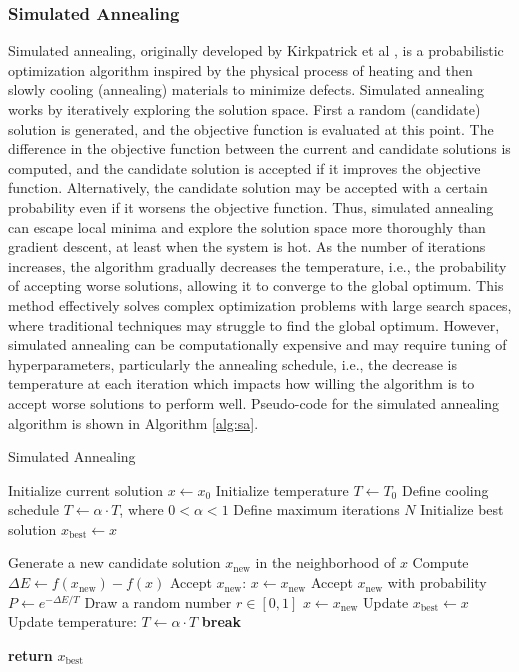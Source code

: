 \documentclass{article}[11pt]
\begin{document}
\subsubsection*{Simulated Annealing}
Simulated annealing, originally developed by Kirkpatrick et al \cite{Kirkpatrick:1983aa}, is a probabilistic optimization algorithm inspired by the physical process of 
heating and then slowly cooling (annealing) materials to minimize defects.
Simulated annealing works by iteratively exploring the solution space. First a random (candidate) solution is generated, and the objective function is evaluated at this point.
The difference in the objective function between the current and candidate solutions is computed, and the candidate solution is accepted if it improves the objective function.
Alternatively, the candidate solution may be accepted with a certain probability even if it worsens the objective function. 
Thus, simulated annealing can escape local minima and explore the solution space more thoroughly than gradient descent, at least when the system is hot.
As the number of iterations increases, the algorithm gradually decreases the temperature, i.e., the probability of accepting worse solutions, allowing it to converge to the global optimum.
This method effectively solves complex optimization problems with large search spaces, where traditional techniques may struggle to find the global optimum.
However, simulated annealing can be computationally expensive and may require tuning of hyperparameters, particularly the annealing schedule, i.e., the decrease is temperature at each iteration which impacts
how willing the algorithm is to accept worse solutions to perform well. Pseudo-code for the simulated annealing algorithm is shown in Algorithm \ref{alg:sa}.

\begin{algorithm}[H]
\caption{Simulated Annealing}\label{alg:sa}
\begin{algorithmic}[1]
\State Initialize current solution $x \gets x_0$
\State Initialize temperature $T \gets T_0$
\State Define cooling schedule $T \gets \alpha \cdot T$, where $0 < \alpha < 1$
\State Define maximum iterations $N$
\State Initialize best solution $x_\text{best} \gets x$

    \State Generate a new candidate solution $x_\text{new}$ in the neighborhood of $x$
    \State Compute $\Delta E \gets f(x_\text{new}) - f(x)$
        \State Accept $x_\text{new}$: $x \gets x_\text{new}$
    \Else
        \State Accept $x_\text{new}$ with probability $P \gets e^{-\Delta E / T}$
        \State Draw a random number $r \in [0, 1]$
            \State $x \gets x_\text{new}$
        \EndIf
    \EndIf
        \State Update $x_\text{best} \gets x$
    \EndIf
    \State Update temperature: $T \gets \alpha \cdot T$
        \State \textbf{break}
    \EndIf
\EndFor

\State \textbf{return} $x_\text{best}$
\end{algorithmic}
\end{algorithm}
\end{document}
